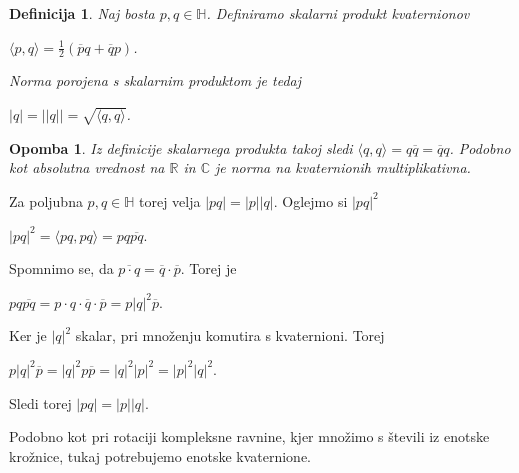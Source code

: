 \documentclass[a4paper,12pt]{article}
\def\R{\mathbb{R}} %
\def\C{\mathbb{C}} %
\def\H{\mathbb{H}} %
\newcommand{\dotpr}[2]{\langle #1, #2 \rangle}
\newtheorem{opomba}{Opomba}
\newtheorem{definicija}{Definicija}
\begin{document}
\break
\begin{definicija}
Naj bosta $p,q \in \H$. Definiramo skalarni produkt kvaternionov
\begin{center}
   $\dotpr{p}{q} = \frac{1}{2} (\overline{p}q + \overline{q}p)$.\emph{~\cite{weiner2005quaternions}}
\end{center}
Norma porojena s skalarnim produktom je tedaj
\begin{center}
   $|q| = ||q|| = \sqrt{\dotpr{q}{q}}$.
\end{center}
\end{definicija}

\begin{opomba}
Iz definicije skalarnega produkta takoj sledi $\langle q, q\rangle = q\overline{q} = \overline{q}q$.
Podobno kot absolutna vrednost na $\R$ in $\C$ je norma na kvaternionih multiplikativna.
\end{opomba}
Za poljubna $p,q \in \H$ torej velja $|pq| = |p||q|$. Oglejmo si $|pq|^2$
\begin{center}
   $|pq|^2 = \langle pq, pq \rangle = pq\overline{pq}$.
\end{center}
Spomnimo se, da $\overline{p \cdot q} = \overline{q} \cdot \overline{p}$. Torej je
\begin{center}
   $pq\overline{pq} = p\cdot q\cdot \overline{q} \cdot \overline{p} = p |q|^2 \overline{p}$.
\end{center}
Ker je $|q|^2$ skalar, pri množenju komutira s kvaternioni. Torej
\begin{center}
   $p|q|^2\overline{p} = |q|^2p\overline{p} = |q|^2 |p|^2 = |p|^2 |q|^2$.
\end{center}
Sledi torej $|pq| = |p||q|$. ~\cite{weiner2005quaternions}

Podobno kot pri rotaciji kompleksne ravnine, kjer množimo s števili iz enotske krožnice, tukaj potrebujemo 
enotske kvaternione.
\end{document}
